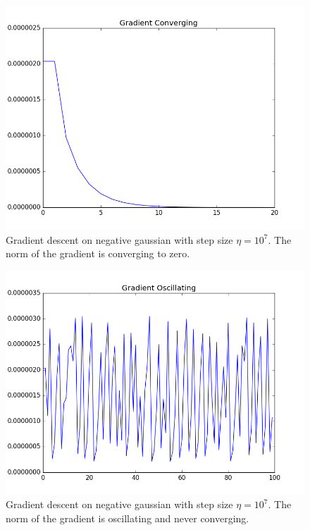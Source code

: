 \documentclass[a4paper,twoside]{article}
\begin{document}
\begin{figure}[h]
  \includegraphics[width=\linewidth]{../Figures/P1/gradient_converging.png}
  \caption{Gradient descent on negative gaussian with step size $\eta = 10^7$. The norm of the gradient is converging to zero.}
  \label{fig:gradient_converging}
\end{figure}

\begin{figure}[h]
  \includegraphics[width=\linewidth]{../Figures/P1/gradient_oscillating.png}
  \caption{Gradient descent on negative gaussian with step size $\eta = 10^7$. The norm of the gradient is oscillating and never converging.}
  \label{fig:gradient_oscillating}
\end{figure}
\end{document}
